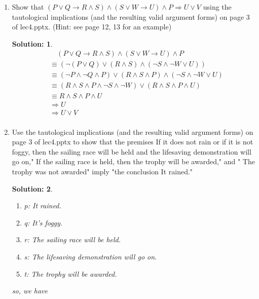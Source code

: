 \documentclass{article}
\theoremstyle{break}
\newtheorem*{solution*}{\textbf{Solution:} }
\begin{document}
\begin{enumerate}
    \item 
    Show that $(P \lor Q \to R \land S ) \land (S \lor W \to U) \land P \Rightarrow U \lor V$ 
    using the tautological implications  (and  the  resulting  valid  argument  forms)  on  page  3  of  lec4.pptx.   (Hint:  
    see page 12, 13 for an example)
    
    \begin{solution*}
        \begin{equation}
            \begin{aligned}
                & \quad (P \lor Q \to R \land S ) \land (S \lor W \to U) \land P \\
                & \equiv (\lnot (P \lor Q) \lor (R \land S) \land (\lnot S \land \lnot W \lor U)) \\
                & \equiv (\lnot P \land \lnot Q \land P) \lor  (R \land S  \land P) \land (\lnot S \land \lnot W \lor U) \\
                & \equiv (R \land S \land P \land \lnot S \land \lnot W ) \lor (R \land S \land P \land U) \\
                & \equiv R \land S \land P \land U \\
                & \Rightarrow U \\
                & \Rightarrow U \lor V\\
            \end{aligned}
        \end{equation}
    \end{solution*}
    \newpage
    \item 
        Use the tautological implications (and the resulting valid argument forms) on
    page 3 of lec4.pptx to show that the premises If it does not rain or if it is not foggy, then
    the sailing race will be held and the lifesaving demonstration will go on," If the sailing race
    is held, then the trophy will be awarded," and " The trophy was not awarded" imply "the
    conclusion It rained."
    \begin{solution*}\leavevmode
        \begin{enumerate}[]
            \item p: It rained. 
            \item q: It's foggy.
            \item r: The sailing race will be held.
            \item s: The lifesaving demonstration will go on.
            \item t: The trophy will be awarded.
        \end{enumerate}
        so, we have


\end{solution*}
\end{enumerate}
\end{document}
